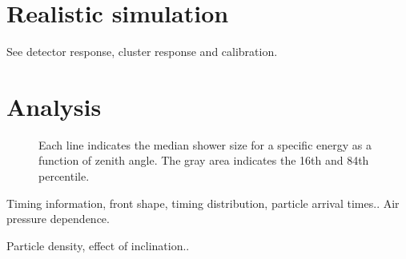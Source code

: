 \section{Realistic simulation}



See detector response, cluster response and calibration.


\section{Analysis}


\begin{figure}
    \centering
    
    \caption{
             Each line indicates the median shower size for a specific
             energy as a function of zenith angle. The gray area
             indicates the 16th and 84th percentile.}
    \label{fig:simulations_shower_sizes}
\end{figure}



Timing information, front shape, timing distribution, particle arrival times..
Air pressure dependence.

Particle density, effect of inclination..
